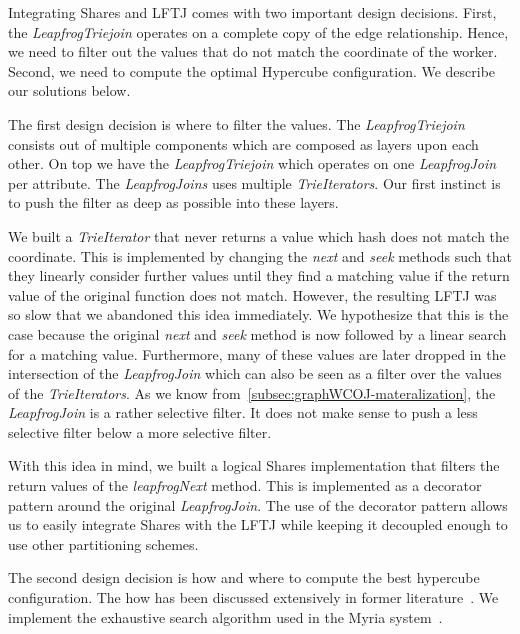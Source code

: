 Integrating Shares and \textsc{LFTJ} comes with two important design decisions.
First, the \textit{LeapfrogTriejoin} operates on a complete copy of the edge relationship.
Hence, we need to filter out the values that do not match the coordinate of the worker.
Second, we need to compute the optimal Hypercube configuration.
We describe our solutions below.

The first design decision is where to filter the values.
The \textit{LeapfrogTriejoin} consists out of multiple components which are composed as layers upon each other.
On top we have the \textit{LeapfrogTriejoin} which operates on one \textit{LeapfrogJoin} per attribute.
The \textit{LeapfrogJoins} uses multiple \textit{TrieIterators}.
Our first instinct is to push the filter as deep as possible into these layers.

We built a \textit{TrieIterator} that never returns a value which hash does not match the coordinate.
This is implemented by changing the \textit{next} and \textit{seek} methods such that they linearly
consider further values until they find a matching value if the return value of the original function does not match.
However, the resulting \textsc{LFTJ} was so slow that we abandoned this idea immediately.
We hypothesize that this is the case because the original \textit{next} and \textit{seek} method is now followed
by a linear search for a matching value.
Furthermore, many of these values are later dropped in the intersection of the \textit{LeapfrogJoin} which
can also be seen as a filter over the values of the \textit{TrieIterators}.
As we know from~\cref{subsec:graphWCOJ-materalization}, the \textit{LeapfrogJoin} is a rather selective filter.
It does not make sense to push a less selective filter below a more selective filter.

With this idea in mind, we built a logical Shares implementation that filters the return values of the \textit{leapfrogNext}
method.
This is implemented as a decorator pattern around the original \textit{LeapfrogJoin}.
The use of the decorator pattern allows us to easily integrate Shares with the \textsc{LFTJ} while keeping it decoupled enough
to use other partitioning schemes.

The second design decision is how and where to compute the best hypercube configuration.
The how has been discussed extensively in former literature~\cite{shares,myria-detailed,shares-proof,shares-skew}.
We implement the exhaustive search algorithm used in the Myria system~\cite{myria-detailed}.

